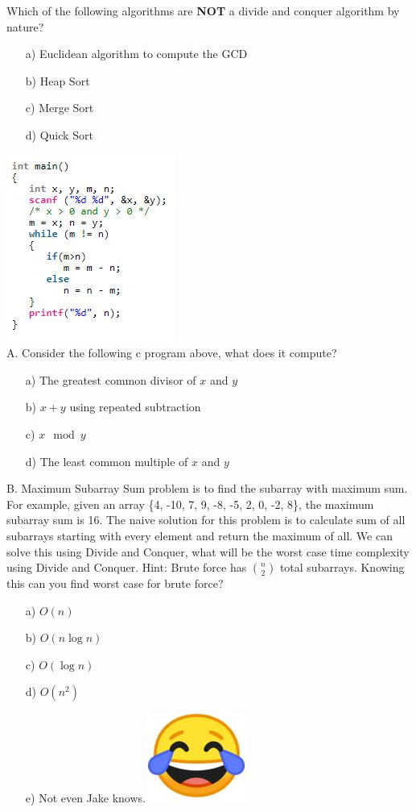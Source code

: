 \documentclass[12pt]{article}
\begin{document}
Which of the following algorithms are \textbf{NOT} a divide and conquer algorithm by nature?\\
\begin{enumerate}
    \item[a)]Euclidean algorithm to compute the GCD
    \item[b)]Heap Sort
    \item[c)]Merge Sort
    \item[d)]Quick Sort
\end{enumerate}
\newpage
\noindent \includegraphics{c.jpg}\\
A. Consider the following c program above, what does it compute?
\begin{enumerate}
    \item[a)]The greatest common divisor of $x$ and $y$
    \item[b)]$x + y$ using repeated subtraction
    \item[c)]$x \mod y$ 
    \item[d)]The least common multiple of $x$ and $y$
\end{enumerate}
B. Maximum Subarray Sum problem is to find the subarray with maximum sum. For example, given an array \{4, -10, 7, 9, -8, -5, 2, 0, -2, 8\}, the maximum subarray sum is 16. The naive solution for this problem is to calculate sum of all subarrays starting with every element and return the maximum of all. We can solve this using Divide and Conquer, what will be the worst case time complexity using Divide and Conquer. Hint: Brute force has $\binom{n}{2}$ total subarrays. Knowing this can you find worst case for brute force?\\
\begin{enumerate}
    \item[a)]$O(n)$
    \item[b)]$O(n\log{n})$
    \item[c)]$O(\log{n})$
    \item[d)]$O(n^2)$
    \item[e)]Not even Jake knows.\includegraphics[scale = 0.2]{cry.jpg} 
\end{enumerate}
\end{document}
